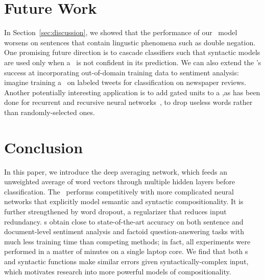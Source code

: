 \section{Future Work}
\label{sec:future}
In Section~\ref{sec:discussion}, we showed that the performance of our \dan\ model
worsens on sentences that contain lingustic phenomena such as double
negation. One promising future direction is to cascade classifiers such that syntactic models are used only when a \dan\ is not confident
in its prediction. We can also extend the \dan 's success at incorporating out-of-domain training data to sentiment analysis: imagine training a \dan\ on labeled tweets for classification on newspaper reviews. Another potentially interesting application is to add gated units to a \dan,as has been done for recurrent and recursive neural networks~\cite{hochreiter1997long,cho2014learning,sutskever2014sequence,taiacl15}, to drop useless words rather than randomly-selected ones.




\section{Conclusion}
\label{sec:conclusion}
In this paper, we introduce the deep averaging network, which feeds an unweighted average of word vectors through multiple hidden layers before classification. The \dan\ performs competitively with more complicated neural networks that explicitly model semantic and syntactic compositionality. It is further strengthened by word dropout, a regularizer that reduces input redundancy. \dan s obtain close to state-of-the-art accuracy on both sentence and document-level sentiment analysis and factoid question-answering tasks with much less training time than competing methods; in fact, all experiments were performed in a matter of minutes on a single laptop core. We find that both \dan s and syntactic functions make similar errors given syntactically-complex input, which motivates research into more powerful models of compositionality.